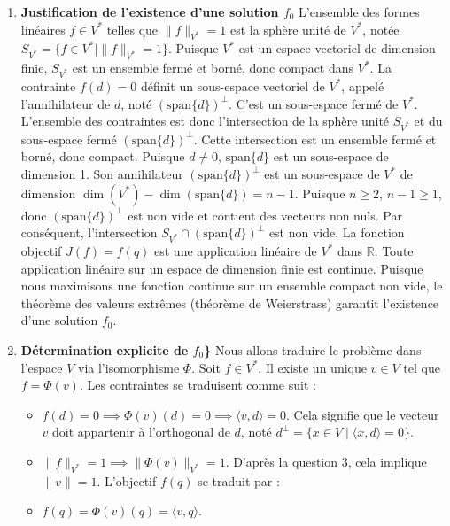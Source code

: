 \documentclass[11pt,a4paper]{report}
\begin{document}
\begin{enumerate}
  \begin{enumerate}
  \def\labelenumii{\alph{enumii}.}
  \item
    \textbf{Justification de l'existence d'une solution \(f_0\)}
    L'ensemble des formes linéaires \(f \in V^*\) telles que
    \(\|f\|_{V^*} = 1\) est la sphère unité de \(V^*\), notée
    \(S_{V^*} = \{f \in V^* \mid \|f\|_{V^*} = 1\}\). Puisque \(V^*\)
    est un espace vectoriel de dimension finie, \(S_{V^*}\) est un
    ensemble fermé et borné, donc compact dans \(V^*\). La contrainte
    \(f(d) = 0\) définit un sous-espace vectoriel de \(V^*\), appelé
    l'annihilateur de \(d\), noté \((\text{span}\{d\})^\perp\). C'est un
    sous-espace fermé de \(V^*\). L'ensemble des contraintes est donc
    l'intersection de la sphère unité \(S_{V^*}\) et du sous-espace
    fermé \((\text{span}\{d\})^\perp\). Cette intersection est un
    ensemble fermé et borné, donc compact. Puisque \(d \neq 0\),
    \(\text{span}\{d\}\) est un sous-espace de dimension 1. Son
    annihilateur \((\text{span}\{d\})^\perp\) est un sous-espace de
    \(V^*\) de dimension \(\dim(V^*) - \dim(\text{span}\{d\}) = n-1\).
    Puisque \(n \ge 2\), \(n-1 \ge 1\), donc
    \((\text{span}\{d\})^\perp\) est non vide et contient des vecteurs
    non nuls. Par conséquent, l'intersection
    \(S_{V^*} \cap (\text{span}\{d\})^\perp\) est non vide. La fonction
    objectif \(J(f) = f(q)\) est une application linéaire de \(V^*\)
    dans \(\mathbb{R}\). Toute application linéaire sur un espace de
    dimension finie est continue. Puisque nous maximisons une fonction
    continue sur un ensemble compact non vide, le théorème des valeurs
    extrêmes (théorème de Weierstrass) garantit l'existence d'une
    solution \(f_0\).
  \item
    \textbf{Détermination explicite de \(f_0\)\}} Nous allons traduire
    le problème dans l'espace \(V\) via l'isomorphisme \(\Phi\). Soit
    \(f \in V^*\). Il existe un unique \(v \in V\) tel que
    \(f = \Phi(v)\). Les contraintes se traduisent comme suit :

    \begin{itemize}

    \item
      \(f(d) = 0 \implies \Phi(v)(d) = 0 \implies \langle v, d \rangle = 0\).
      Cela signifie que le vecteur \(v\) doit appartenir à l'orthogonal
      de \(d\), noté
      \(d^\perp = \{x \in V \mid \langle x, d \rangle = 0\}\).
    \item
      \(\|f\|_{V^*} = 1 \implies \|\Phi(v)\|_{V^*} = 1\). D'après la
      question 3, cela implique \(\|v\| = 1\). L'objectif \(f(q)\) se
      traduit par :
    \item
      \(f(q) = \Phi(v)(q) = \langle v, q \rangle\).
    \end{itemize}


\end{enumerate}
\end{enumerate}
\end{document}
